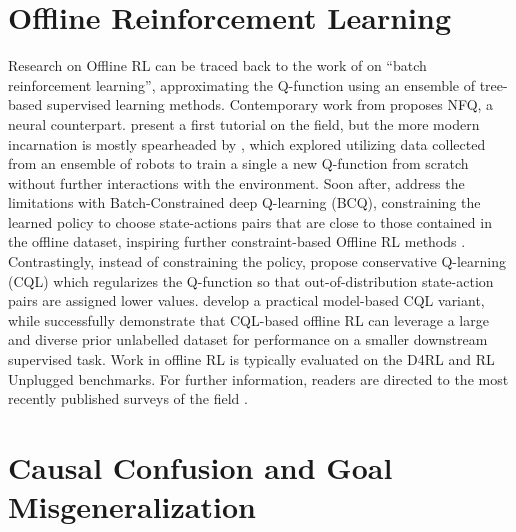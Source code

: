 \documentclass[../main.tex]{subfiles}
\begin{document}
\section{Offline Reinforcement Learning}

Research on Offline RL can be traced back to the work of \citet{ernst_tree-based_2005} on ``batch
reinforcement learning'', approximating the Q-function using an ensemble of tree-based supervised
learning methods. Contemporary work from \citet{riedmiller_neural_2005} proposes NFQ, a neural
counterpart.  present a first tutorial on the field, but the more modern
incarnation is mostly spearheaded by \citet{kalashnikov_scalable_2018}, which explored utilizing
data collected from an ensemble of robots to train a single a new Q-function from scratch without
further interactions with the environment. Soon after, \citet{fujimoto_off-policy_2019} address the
limitations with Batch-Constrained deep Q-learning (BCQ), constraining the learned policy to choose
state-actions pairs that are close to those contained in the offline dataset, inspiring further
constraint-based Offline RL methods \citep{kumar_stabilizing_2019, xu_offline_2021}. Contrastingly,
instead of constraining the policy, \citet{kumar_conservative_2020} propose conservative Q-learning
(CQL) which regularizes the Q-function so that out-of-distribution state-action pairs are assigned
lower values.  develop a practical model-based CQL variant, while
\citet{singh_cog_2020} successfully demonstrate that CQL-based offline RL can leverage a large and
diverse prior unlabelled dataset for performance on a smaller downstream supervised task. Work in
offline RL is typically evaluated on the D4RL \citep{fu_d4rl_2021} and RL Unplugged
\citep{gulcehre_rl_2020} benchmarks. For further information, readers are directed to the most
recently published surveys of the field \citep{levine_offline_2020, prudencio_survey_2022}.

\section{Causal Confusion and Goal Misgeneralization} 
\end{document}
